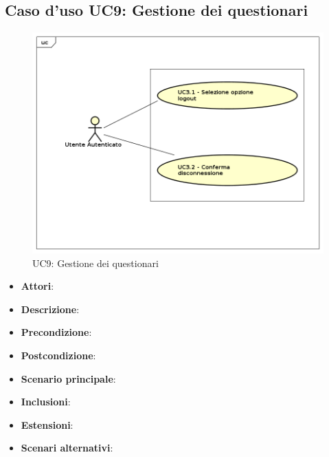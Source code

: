 \subsection{Caso d'uso UC9: Gestione dei questionari}
\label{UC9}
\begin{figure}[h]
	\centering
	\includegraphics[scale=0.7,keepaspectratio]{UML/UC9.png}
	\caption{UC9: Gestione dei questionari}
\end{figure}
\FloatBarrier
\begin{itemize}
	\item \textbf{Attori}: 
	\item \textbf{Descrizione}: 
	\item \textbf{Precondizione}: 
	\item \textbf{Postcondizione}: 
	\item \textbf{Scenario principale}:
	\item \textbf{Inclusioni}:
	\item \textbf{Estensioni}:
	\item \textbf{Scenari alternativi}:
\end{itemize}

